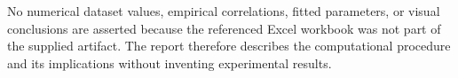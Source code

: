 \documentclass[11pt,a4paper]{article}
\begin{document}
No numerical dataset values, empirical correlations, fitted parameters, or visual conclusions are asserted because the referenced Excel workbook was not part of the supplied artifact. The report therefore describes the computational procedure and its implications without inventing experimental results.
\end{document}
